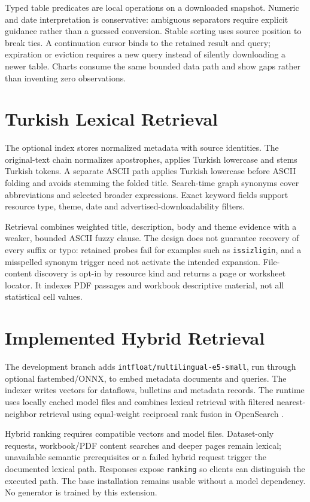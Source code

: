 \documentclass[a4paper,12pt]{report}
\newcommand{\code}[1]{\texttt{\small #1}}
\begin{document}
Typed table predicates are local operations on a downloaded snapshot. Numeric and date interpretation is conservative: ambiguous separators require explicit guidance rather than a guessed conversion. Stable sorting uses source position to break ties. A continuation cursor binds to the retained result and query; expiration or eviction requires a new query instead of silently downloading a newer table. Charts consume the same bounded data path and show gaps rather than inventing zero observations.

\section{Turkish Lexical Retrieval}
The optional index stores normalized metadata with source identities. The original-text chain normalizes apostrophes, applies Turkish lowercase and stems Turkish tokens. A separate ASCII path applies Turkish lowercase before ASCII folding and avoids stemming the folded title. Search-time graph synonyms cover abbreviations and selected broader expressions. Exact keyword fields support resource type, theme, date and advertised-downloadability filters.

Retrieval combines weighted title, description, body and theme evidence with a weaker, bounded ASCII fuzzy clause. The design does not guarantee recovery of every suffix or typo: retained probes fail for examples such as \code{issizligin}, and a misspelled synonym trigger need not activate the intended expansion. File-content discovery is opt-in by resource kind and returns a page or worksheet locator. It indexes PDF passages and workbook descriptive material, not all statistical cell values.

\section{Implemented Hybrid Retrieval}
The development branch adds \code{intfloat/multilingual-e5-small}, run through optional fastembed/ONNX, to embed metadata documents and queries. The indexer writes vectors for dataflows, bulletins and metadata records. The runtime uses locally cached model files and combines lexical retrieval with filtered nearest-neighbor retrieval using equal-weight reciprocal rank fusion in OpenSearch \cite{hybrid}.

Hybrid ranking requires compatible vectors and model files. Dataset-only requests, workbook/PDF content searches and deeper pages remain lexical; unavailable semantic prerequisites or a failed hybrid request trigger the documented lexical path. Responses expose \code{ranking} so clients can distinguish the executed path. The base installation remains usable without a model dependency. No generator is trained by this extension.
\end{document}

